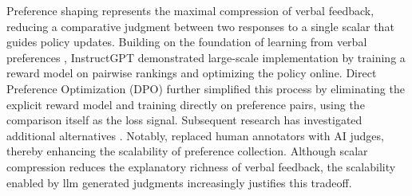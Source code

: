 Preference shaping represents the maximal compression of verbal feedback, reducing a comparative judgment between two responses to a single scalar that guides policy updates. Building on the foundation of learning from verbal preferences \citep{christiano2017deep}, InstructGPT \citep{ouyang2022training} demonstrated large-scale implementation by training a reward model on pairwise rankings and optimizing the policy online. Direct Preference Optimization (DPO) \citep{rafailov2023direct} further simplified this process by eliminating the explicit reward model and training directly on preference pairs, using the comparison itself as the loss signal. Subsequent research has investigated additional alternatives \citep{ethayarajh2024kto, hong2024orpo, meng2024simpo, azar2024general}. Notably, \citet{lee2023rlaif} replaced human annotators with AI judges, thereby enhancing the scalability of preference collection.  Although scalar compression reduces the explanatory richness of verbal feedback, the scalability enabled by llm generated judgments increasingly justifies this tradeoff. 







